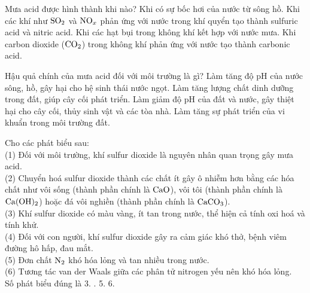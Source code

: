 \documentclass[12pt,a4paper]{article}
\begin{document}
\begin{ex}
Mưa acid được hình thành khi nào?
\choice
{Khi có sự bốc hơi của nước từ sông hồ.}
{\True Khi các khí như $\ce{SO2}$ và $\ce{NO_x}$ phản ứng với nước trong khí quyển tạo thành sulfuric acid và nitric acid.}
{Khi các hạt bụi trong không khí kết hợp với nước mưa.}
{Khi carbon dioxide ($\ce{CO2}$) trong không khí phản ứng với nước tạo thành carbonic acid.}
\end{ex}

\begin{ex}
Hậu quả chính của mưa acid đối với môi trường là gì?
\choice
{Làm tăng độ pH của nước sông, hồ, gây hại cho hệ sinh thái nước ngọt.}
{Làm tăng lượng chất dinh dưỡng trong đất, giúp cây cối phát triển.}
{\True Làm giảm độ pH của đất và nước, gây thiệt hại cho cây cối, thủy sinh vật và các tòa nhà.}
{Làm tăng sự phát triển của vi khuẩn trong môi trường đất.}
\end{ex}

\begin{ex}
Cho các phát biểu sau:\\
(1) Đối với môi trường, khí sulfur dioxide là nguyên nhân quan trọng gây mưa acid.\\
(2) Chuyển hoá sulfur dioxide thành các chất ít gây ô nhiễm hơn bằng các hóa chất như vôi sống (thành phần chính là $\ce{CaO}$), vôi tôi (thành phần chính là $\ce{Ca(OH)2}$) hoặc đá vôi nghiền (thành phần chính là $\ce{CaCO3}$).\\
(3) Khí sulfur dioxide có màu vàng, ít tan trong nước, thể hiện cả tính oxi hoá và tính khử.\\
(4) Đối với con người, khí sulfur dioxide gây ra cảm giác khó thở, bệnh viêm đường hô hấp, đau mắt.\\
(5) Đơn chất $\ce{N2}$ khó hóa lỏng và tan nhiều trong nước.\\
(6) Tương tác van der Waals giữa các phân tử nitrogen yếu nên khó hóa lỏng.\\
Số phát biểu đúng là
\choice
{3.}
{.}
{5.}
{6.}
\end{ex}
\end{document}

